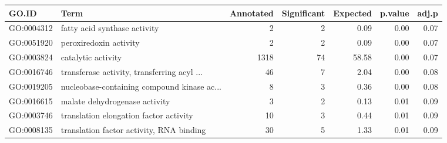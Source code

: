 \begin{table}[ht]
\centering
\begin{tabular}{llrrrrr}
  \hline
GO.ID & Term & Annotated & Significant & Expected & p.value & adj.p \\ 
  \hline
GO:0004312 & fatty acid synthase activity &   2 &   2 & 0.09 & 0.00 & 0.07 \\ 
  GO:0051920 & peroxiredoxin activity &   2 &   2 & 0.09 & 0.00 & 0.07 \\ 
  GO:0003824 & catalytic activity & 1318 &  74 & 58.58 & 0.00 & 0.07 \\ 
  GO:0016746 & transferase activity, transferring acyl ... &  46 &   7 & 2.04 & 0.00 & 0.08 \\ 
  GO:0019205 & nucleobase-containing compound kinase ac... &   8 &   3 & 0.36 & 0.00 & 0.08 \\ 
  GO:0016615 & malate dehydrogenase activity &   3 &   2 & 0.13 & 0.01 & 0.09 \\ 
  GO:0003746 & translation elongation factor activity &  10 &   3 & 0.44 & 0.01 & 0.09 \\ 
  GO:0008135 & translation factor activity, RNA binding &  30 &   5 & 1.33 & 0.01 & 0.09 \\ 
   \hline
\end{tabular}
\end{table}
